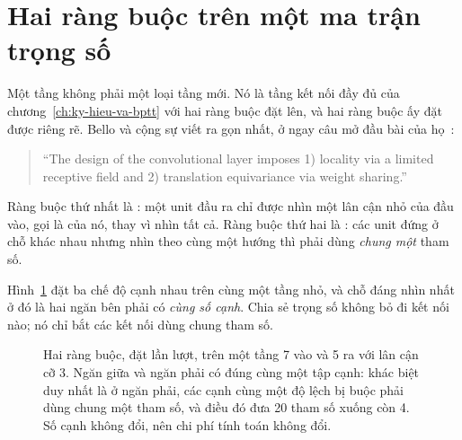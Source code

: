 \section{Hai ràng buộc trên một ma trận trọng số}
\label{sec:ch10-hai-rang-buoc}

%
Một tầng  không phải một loại tầng mới. Nó là tầng
kết nối đầy đủ của chương~\ref{ch:ky-hieu-va-bptt} với hai ràng buộc đặt lên,
và hai ràng buộc ấy đặt được riêng rẽ. Bello và cộng sự viết ra gọn nhất, ở
ngay câu mở đầu bài của họ~\autocite{bello2019attention}:

\begin{quote}
\enquote{The design of the convolutional layer imposes 1) locality via a
limited receptive field and 2) translation equivariance via weight sharing.}
\end{quote}

Ràng buộc thứ nhất là : một unit đầu ra chỉ được nhìn
một lân cận nhỏ của đầu vào, gọi là  của
nó, thay vì nhìn tất cả. Ràng buộc thứ hai là
: các unit đứng ở chỗ khác nhau nhưng nhìn
theo cùng một hướng thì phải dùng \emph{chung một} tham số.

Hình~\ref{fig:ch10-hai-rang-buoc} đặt ba chế độ cạnh nhau trên cùng một tầng
nhỏ, và chỗ đáng nhìn nhất ở đó là hai ngăn bên phải có \emph{cùng số cạnh}.
Chia sẻ trọng số không bỏ đi kết nối nào; nó chỉ bắt các kết nối dùng chung
tham số.

%
\begin{figure}[htbp]
  \centering
  
  \caption{Hai ràng buộc, đặt lần lượt, trên một tầng 7 vào và 5 ra với lân cận
  cỡ 3. Ngăn giữa và ngăn phải có đúng cùng một tập cạnh: khác biệt duy nhất là
  ở ngăn phải, các cạnh cùng một độ lệch bị buộc phải dùng chung một tham số,
  và điều đó đưa 20 tham số xuống còn 4. Số cạnh không đổi, nên chi phí tính
  toán không đổi.}
  \label{fig:ch10-hai-rang-buoc}
\end{figure}

